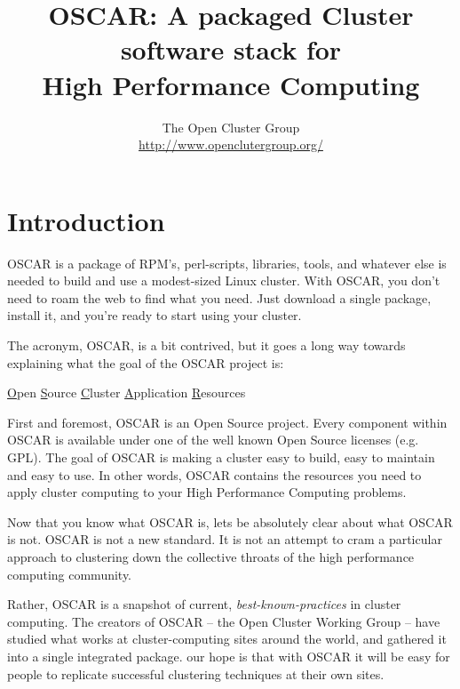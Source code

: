 \documentclass[letterpaper,11pt]{article}
\begin{document}
\title{OSCAR: A packaged Cluster software stack for \\
       High Performance Computing} 
\author{The Open Cluster Group \\
\url{http://www.openclutergroup.org/}}

\maketitle



\section{Introduction}
OSCAR is a package of RPM's, perl-scripts, libraries, tools, and
whatever else is needed to build and use a modest-sized Linux cluster.
With OSCAR, you don't need to roam the web to find what you need.
Just download a single package, install it, and you're ready to start
using your cluster.

The acronym, OSCAR, is a bit contrived, but it goes a long way towards
explaining what the goal of the OSCAR project is: 
\begin{center}
 \underline{O}pen \underline{S}ource \underline{C}luster 
 \underline{A}pplication \underline{R}esources
\end{center}

First and foremost, OSCAR is an Open Source project.  Every component
within OSCAR is available under one of the well known Open Source
licenses (e.g. GPL).  The goal of OSCAR is making a cluster easy to
build, easy to maintain and easy to use.  In other words, OSCAR
contains the resources you need to apply cluster computing to your
High Performance Computing problems.

Now that you know what OSCAR is, lets be absolutely clear about what
OSCAR is not.  OSCAR is not a new standard.  It is not an attempt to
cram a particular approach to clustering down the collective throats
of the high performance computing community.

Rather, OSCAR is a snapshot of current, \emph{best-known-practices} in
cluster computing.  The creators of OSCAR -- the Open Cluster Working
Group -- have studied what works at cluster-computing sites around the
world, and gathered it into a single integrated package.  our hope is
that with OSCAR it will be easy for people to replicate successful
clustering techniques at their own sites.
\end{document}
